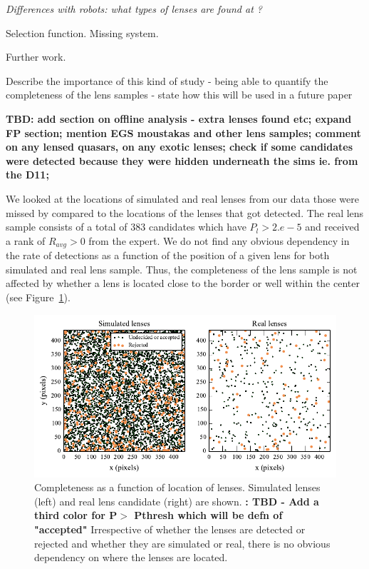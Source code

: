 \documentclass[useAMS,usenatbib,a4paper]{mn2e}
\begin{document}
{\it Differences with robots: what types of lenses are found at \sw?

Selection function. Missing system.

Further work.

Describe the importance of this kind of study 
- being able to quantify the completeness of the lens samples
- state how this will be used in a future \sw paper }

{\bf TBD: 
add section on offline analysis - extra lenses found etc;  
expand FP section;  
mention EGS moustakas and other lens samples; 
comment on any lensed quasars, on any exotic lenses;
check if some candidates were detected because they were hidden
underneath the sims ie. from the D11;

}

We looked at the locations of simulated and real lenses from our data
those were missed by \sw compared to the locations of the lenses that
got detected. The real lens sample consists of a total of 383 candidates
which have $P_l>2.e-5$ and received a rank of $R_{avg}>0$ from the
expert. We do not find any obvious dependency in the rate of detections
as a function of the position of a given lens for both simulated and
real lens sample. Thus, the completeness of the lens sample is not
affected by whether a lens is located close to the border or well within
the center (see  Figure~\ref{fig:comppos}).

\begin{figure}
\begin{center}
\includegraphics[scale=0.95]{sw-cfhtls-figs/completeness_pos.pdf}
\caption{ \label{fig:comppos}
Completeness as a function of location of lenses. Simulated lenses (left) and
real lens candidate (right) are shown. {\bf: TBD - Add a third color for
P$>$ Pthresh which will be defn of "accepted"} Irrespective of whether the
lenses are detected or rejected and whether they are simulated or real,
there is no obvious dependency on where the lenses are located. 
}
\end{center}
\end{figure}
\end{document}
